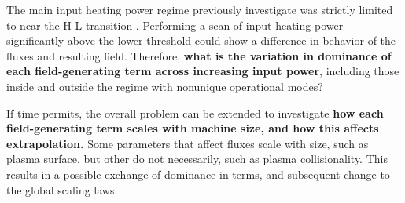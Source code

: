 \documentclass[a4paper]{article}
\begin{document}
The main input heating power regime previously investigate was strictly limited to near the H-L transition \cite{staps_backstepping_2017}.
Performing a scan of input heating power significantly above the lower threshold could show a difference in behavior of the fluxes and resulting field.
Therefore, \textbf{what is the variation in dominance of each field-generating term across increasing input power}, including those inside and outside the regime with nonunique operational modes?

If time permits, the overall problem can be extended to investigate \textbf{how each field-generating term scales with machine size, and how this affects extrapolation.}
Some parameters that affect fluxes scale with size, such as plasma surface, but other do not necessarily, such as plasma collisionality.
This results in a possible exchange of dominance in terms, and subsequent change to the global scaling laws.


\printbibliography
\end{document}
